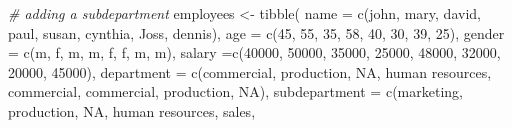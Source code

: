 \documentclass[
]{book}
\newenvironment{Shaded}{\begin{snugshade}}{\end{snugshade}}
\newcommand{\AttributeTok}[1]{\textcolor[rgb]{0.77,0.63,0.00}{#1}}
\newcommand{\CommentTok}[1]{\textcolor[rgb]{0.56,0.35,0.01}{\textit{#1}}}
\newcommand{\ConstantTok}[1]{\textcolor[rgb]{0.00,0.00,0.00}{#1}}
\newcommand{\DecValTok}[1]{\textcolor[rgb]{0.00,0.00,0.81}{#1}}
\newcommand{\FunctionTok}[1]{\textcolor[rgb]{0.00,0.00,0.00}{#1}}
\newcommand{\NormalTok}[1]{#1}
\newcommand{\OtherTok}[1]{\textcolor[rgb]{0.56,0.35,0.01}{#1}}
\newcommand{\StringTok}[1]{\textcolor[rgb]{0.31,0.60,0.02}{#1}}
\begin{document}
\begin{Shaded}
\begin{Highlighting}[]
\CommentTok{\# adding a subdepartment}
\NormalTok{employees }\OtherTok{\textless{}{-}} \FunctionTok{tibble}\NormalTok{(}
    \AttributeTok{name =} \FunctionTok{c}\NormalTok{(}\StringTok{\textquotesingle{}john\textquotesingle{}}\NormalTok{, }\StringTok{\textquotesingle{}mary\textquotesingle{}}\NormalTok{, }\StringTok{\textquotesingle{}david\textquotesingle{}}\NormalTok{, }\StringTok{\textquotesingle{}paul\textquotesingle{}}\NormalTok{, }\StringTok{\textquotesingle{}susan\textquotesingle{}}\NormalTok{, }\StringTok{\textquotesingle{}cynthia\textquotesingle{}}\NormalTok{, }\StringTok{\textquotesingle{}Joss\textquotesingle{}}\NormalTok{, }\StringTok{\textquotesingle{}dennis\textquotesingle{}}\NormalTok{),}
    \AttributeTok{age =} \FunctionTok{c}\NormalTok{(}\DecValTok{45}\NormalTok{, }\DecValTok{55}\NormalTok{, }\DecValTok{35}\NormalTok{, }\DecValTok{58}\NormalTok{, }\DecValTok{40}\NormalTok{, }\DecValTok{30}\NormalTok{, }\DecValTok{39}\NormalTok{, }\DecValTok{25}\NormalTok{),}
    \AttributeTok{gender =} \FunctionTok{c}\NormalTok{(}\StringTok{\textquotesingle{}m\textquotesingle{}}\NormalTok{, }\StringTok{\textquotesingle{}f\textquotesingle{}}\NormalTok{, }\StringTok{\textquotesingle{}m\textquotesingle{}}\NormalTok{, }\StringTok{\textquotesingle{}m\textquotesingle{}}\NormalTok{, }\StringTok{\textquotesingle{}f\textquotesingle{}}\NormalTok{, }\StringTok{\textquotesingle{}f\textquotesingle{}}\NormalTok{, }\StringTok{\textquotesingle{}m\textquotesingle{}}\NormalTok{, }\StringTok{\textquotesingle{}m\textquotesingle{}}\NormalTok{),}
    \AttributeTok{salary =}\FunctionTok{c}\NormalTok{(}\DecValTok{40000}\NormalTok{, }\DecValTok{50000}\NormalTok{, }\DecValTok{35000}\NormalTok{, }\DecValTok{25000}\NormalTok{, }\DecValTok{48000}\NormalTok{, }\DecValTok{32000}\NormalTok{, }\DecValTok{20000}\NormalTok{, }\DecValTok{45000}\NormalTok{),}
    \AttributeTok{department =} \FunctionTok{c}\NormalTok{(}\StringTok{\textquotesingle{}commercial\textquotesingle{}}\NormalTok{, }\StringTok{\textquotesingle{}production\textquotesingle{}}\NormalTok{, }\ConstantTok{NA}\NormalTok{, }\StringTok{\textquotesingle{}human resources\textquotesingle{}}\NormalTok{, }\StringTok{\textquotesingle{}commercial\textquotesingle{}}\NormalTok{, }
                   \StringTok{\textquotesingle{}commercial\textquotesingle{}}\NormalTok{, }\StringTok{\textquotesingle{}production\textquotesingle{}}\NormalTok{, }\ConstantTok{NA}\NormalTok{),}
    \AttributeTok{subdepartment =} \FunctionTok{c}\NormalTok{(}\StringTok{\textquotesingle{}marketing\textquotesingle{}}\NormalTok{, }\StringTok{\textquotesingle{}production\textquotesingle{}}\NormalTok{, }\ConstantTok{NA}\NormalTok{, }\StringTok{\textquotesingle{}human resources\textquotesingle{}}\NormalTok{, }\StringTok{\textquotesingle{}sales\textquotesingle{}}\NormalTok{, }

\end{Highlighting}
\end{Shaded}
\end{document}
